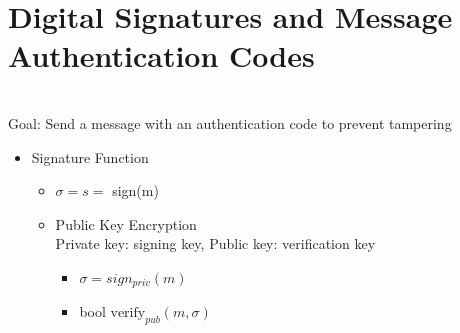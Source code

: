 \section{Digital Signatures and Message Authentication Codes}
\\Goal: Send a message with an authentication code to prevent tampering
\begin{itemize}
\item Signature Function
    \begin{itemize}
    \item $\sigma = s =$ sign(m)
    \item Public Key Encryption
    \\ Private key: signing key, Public key: verification key
        \begin{itemize}
        \item $\sigma = sign_{priv}(m)$
        \item bool $\text{verify}_{pub}(m, \sigma)$
        \end{itemize}
    \end{itemize}
\end{itemize}
